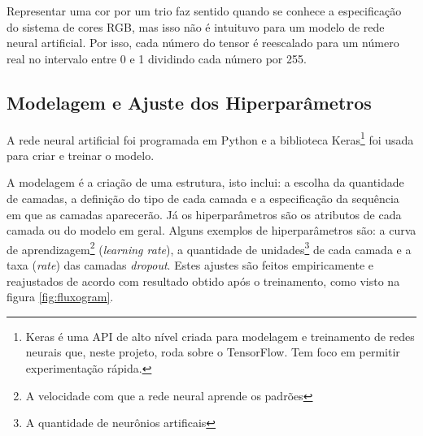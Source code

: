 Representar uma cor por um trio faz sentido quando se conhece a especificação do sistema de cores RGB, mas isso não é intuituvo para um modelo de rede neural artificial. Por isso, cada número do tensor é reescalado para um número real no intervalo entre 0 e 1 dividindo cada número por 255.

\subsection*{Modelagem e Ajuste dos Hiperparâmetros}

A rede neural artificial foi programada em Python e a biblioteca Keras\footnote{Keras é uma API de alto nível criada para modelagem e treinamento de redes neurais que, neste projeto, roda sobre o TensorFlow. Tem foco em permitir experimentação rápida.} foi usada para criar e treinar o modelo.

A modelagem é a criação de uma estrutura, isto inclui: a escolha da quantidade de camadas, a definição do tipo de cada camada e a especificação da sequência em que as camadas aparecerão. Já os hiperparâmetros são os atributos de cada camada ou do modelo em geral. Alguns exemplos de hiperparâmetros são: a curva de aprendizagem\footnote{A velocidade com que a rede neural aprende os padrões} (\emph{learning rate}), a quantidade de unidades\footnote{A quantidade de neurônios artificais} de cada camada e a taxa (\emph{rate}) das camadas \emph{dropout}. Estes ajustes são feitos empiricamente e reajustados de acordo com resultado obtido após o treinamento, como visto na figura \ref{fig:fluxogram}.

\pagebreak

\begin{figure}[h!]
  \centering
  \begin{minipage}[t]{.47\textwidth}
    \centering
    
    \label{fig:conv_model}
  \end{minipage}%
  \hfill%
  \begin{minipage}[t]{.47\textwidth}
    \centering
    
    \label{fig:pretrained_model}
  \end{minipage}
  \end{figure}

